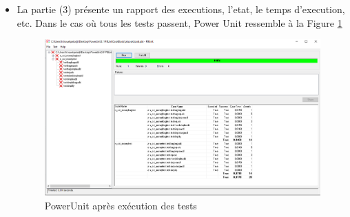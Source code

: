 \documentclass[french]{article}
\theoremstyle{definition}
\begin{document}
\begin{itemize}
  \item La partie (3) présente  un rapport des executions, l'etat, le temps d'execution, etc.
Dans le cas où tous les tests passent, Power Unit ressemble à la Figure \ref{fig:testPassed}
\begin{figure}[!htbp]
    \begin{center}
    \includegraphics[width=1\linewidth]{./testPassed.png}
    \caption{PowerUnit après exécution des tests}
    \label{fig:testPassed}
    \end{center}
  \end{figure}
\end{itemize}
\end{document}
